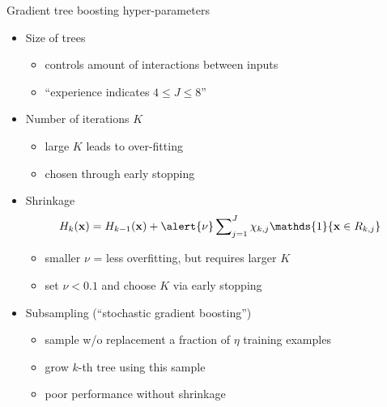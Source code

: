 \documentclass[handout]{beamer}
\renewcommand{\indFun}{\ensuremath{\mathds{1}}}
\begin{document}
\begin{frame}{Gradient tree boosting hyper-parameters}
\begin{itemize}[<+>]
	\item Size of trees
	\begin{itemize}[<.->]
		\item controls amount of interactions between inputs
		\item ``experience indicates $ 4 \le J \le 8 $'' \cite{HastieEtAl2009}
	\end{itemize}
	
	\item Number of iterations $ K $
	\begin{itemize}[<.->]
		\item large $ K $ leads to over-fitting
		\item chosen through early stopping
	\end{itemize}

	\item Shrinkage
	\begin{gather*}
		H_k(\mv x) = H_{k-1}(\mv x) 
		+ \alert{\nu} \sum\nolimits_{j=1}^{J} \chi_{k, j} \indFun\{ \mv x\in R_{k, j} \}
	\end{gather*}
	\begin{itemize}[<.->]
		\item smaller $ \nu $ = less overfitting, but requires larger $ K $
		\item set $ \nu < 0.1 $ and choose $ K $ via early stopping \cite{Friedman2001}
	\end{itemize}
	
	\item Subsampling (``stochastic gradient boosting'')
	\begin{itemize}[<.->]
		\item sample w/o replacement a fraction of $ \eta $ training examples
		\item grow $ k $-th tree using this sample
		\item poor performance without shrinkage
	\end{itemize}
\end{itemize}
\end{frame}
\end{document}
